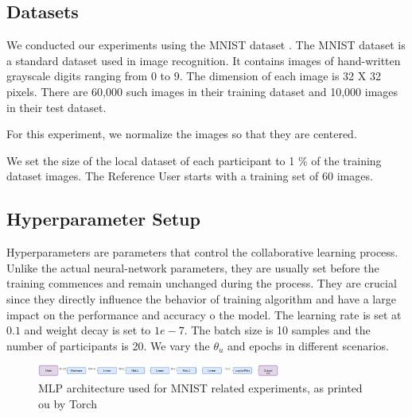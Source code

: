 \documentclass[conference]{IEEEtran}
\begin{document}
\subsection{Datasets}
We conducted our experiments using the MNIST dataset \cite{deng2012mnist}. The MNIST dataset is a standard dataset used in image
recognition.
It contains images of hand-written grayscale digits ranging from 0 to 9. The dimension of each image is 32 X 32 pixels. There
are 60,000 such images in their training dataset and 10,000 images in their test dataset.

For this experiment, we normalize the images so that they are centered. 

We set the size of the local dataset of each participant to 1 \% of the training dataset images. 
The Reference User starts with a training set of 60 images.



\subsection{Hyperparameter Setup}

Hyperparameters are parameters that control the collaborative learning process. Unlike the actual neural-network parameters, they are usually set before the training commences and remain unchanged during the process.
They are crucial since they directly influence the behavior of training algorithm and have a large impact on the performance and accuracy o the model.
The learning rate is set at $0.1$ and weight decay is set to $1e-7$. The batch size is 10 samples and the number of participants is 20. We vary the $\theta_u$ and epochs in different scenarios. 

\begin{figure}[!h]
\includegraphics[width=8cm, keepaspectratio]{MLPArchitecture}
\caption{MLP architecture used for MNIST related experiments, as printed ou by Torch}
\label{fig:MLPArch}

\end{figure}
\end{document}
